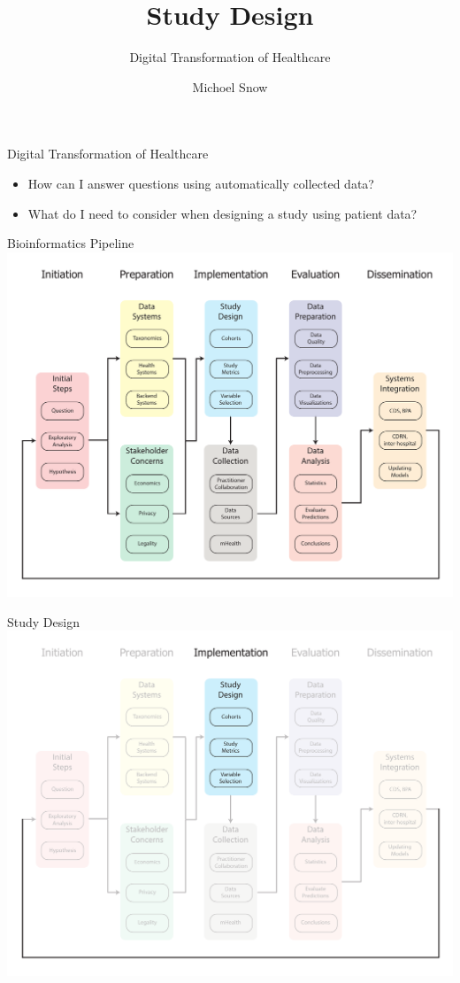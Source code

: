 \documentclass[10pt]{beamer}
\title{Study Design}
\subtitle{Digital Transformation of Healthcare}
\date{}
\author{Michoel Snow}
\institute{Center for Health Data Innovations}
\begin{document}
\maketitle




\begin{frame}{Digital Transformation of Healthcare}
	\begin{itemize}
		\item How can I answer questions using automatically collected data?
		\item What do I need to consider when designing a study using patient data? 
	\end{itemize}
\end{frame}


\begin{frame}{Bioinformatics Pipeline}
	\includegraphics[width=1\textwidth]{images/informatics_pipeline.pdf}
\end{frame}


\begin{frame}{Study Design}
	\includegraphics[width=1\textwidth]{images/informatics_pipeline_studydesign.pdf}
\end{frame}
\end{document}
